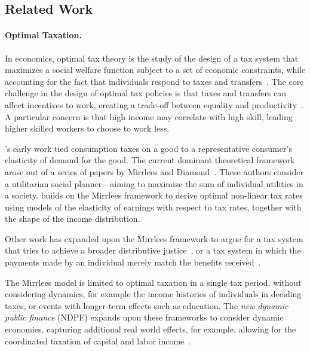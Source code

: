 \subsection{Related Work}
\label{sec:relatedwork}
\paragraph{Optimal Taxation.}
In economics, optimal tax theory is the study of the design of a tax system that maximizes a social welfare function subject to a set of economic constraints, while accounting for the fact that individuals respond to taxes and transfers~\citep{mankiw_optimal_2009,diamond_case_2011}.
The core challenge in the design of optimal tax policies is that taxes and transfers can affect
incentives to work, creating a trade-off between equality and productivity~\citep{mankiw_optimal_2009,diamond_case_2011}.
A particular concern is that high income may correlate with high skill, leading  higher skilled workers to choose to work less.


\cite{ramsey1927contribution}'s early  work tied consumption taxes on a good to a representative consumer's elasticity of demand for the good.
The current dominant theoretical framework  arose out of a series of papers by Mirrlees and Diamond~\citep{diamond1971optimal, diamond1971optimal2,mirrlees_optimal_1976}.
These authors consider a utilitarian social planner---aiming to maximize the sum of individual utilities in a society.
\cite{saez_using_2001} builds on the Mirrlees framework to derive optimal non-linear tax rates using models of the elasticity of earnings with respect to tax rates, together with the shape of the income distribution.

Other work has expanded upon the Mirrlees framework to argue for a tax system that tries to achieve a broader distributive justice~\citep{piketty2013theory,piketty2014optimal,saez2016generalized}, or a tax system in which the payments made by an individual merely match the benefits received~\citep{mankiw_optimal_2009,mankiw2010spreading,mankiw2010optimal}.

The Mirrlees model is limited to optimal taxation in a single tax period, without considering dynamics, for example the income histories of individuals in deciding taxes, or events with longer-term effects such as education.
The {\em new dynamic public finance} (NDPF) expands upon these frameworks to consider dynamic economies, capturing additional real world effects, for example, allowing for the coordinated taxation of capital and labor income~\citep{golosov2003optimal,kocherlakota2005zero,albanesi2006dynamic,kocherlakota_new_2010}.

